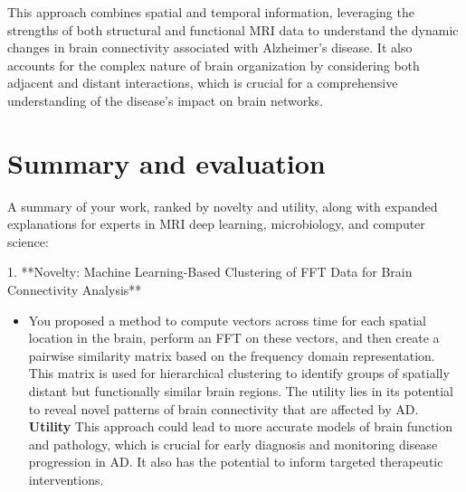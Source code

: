 \documentclass[twocolumn]{article}
\begin{document}
This approach combines spatial and temporal information, leveraging the strengths of both structural and functional MRI data to understand the dynamic changes in brain connectivity associated with Alzheimer's disease. It also accounts for the complex nature of brain organization by considering both adjacent and distant interactions, which is crucial for a comprehensive understanding of the disease's impact on brain networks.

\section{Summary and evaluation}

A summary of your work, ranked by novelty and utility, along with expanded explanations for experts in MRI deep learning, microbiology, and computer science:


1. **Novelty: Machine Learning-Based Clustering of FFT Data for Brain Connectivity Analysis**
\begin{itemize}
\item You proposed a method to compute vectors across time for each spatial location in the brain, perform an FFT on these vectors, and then create a pairwise similarity matrix based on the frequency domain representation. This matrix is used for hierarchical clustering to identify groups of spatially distant but functionally similar brain regions. The utility lies in its potential to reveal novel patterns of brain connectivity that are affected by AD.
   \noindent \textbf{Utility} This approach could lead to more accurate models of brain function and pathology, which is crucial for early diagnosis and monitoring disease progression in AD. It also has the potential to inform targeted therapeutic interventions.
\end{itemize}
\end{document}

